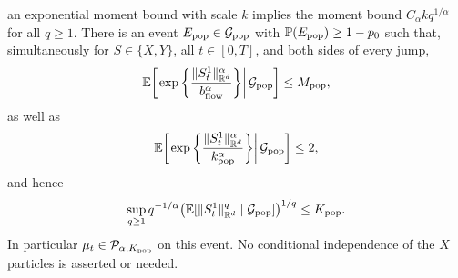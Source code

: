 \begin{lemma}
an exponential moment bound with scale $k$ implies the moment bound
$C_\alpha kq^{1/\alpha}$ for all $q\ge1$.
There is an event $E_{\rm pop}\in\mathcal G_{\rm pop}$ with
$\mathbb P(E_{\rm pop})\ge1-p_0$ such that, simultaneously for
$S\in\{X,Y\}$, all $t\in[0,T]$, and both sides of every jump,
\begin{equation}
\label{eq:population-fixed-scale-exponential}
 \mathbb E\!\left[
  \left.\exp\left\{\frac{\|S_t^1\|_{\mathbb R^d}^\alpha}{b_{\rm flow}^\alpha}\right\}
  \right|\mathcal G_{\rm pop}\right]\le M_{\rm pop},
\end{equation}
as well as
\begin{equation}
\label{eq:population-uniform-conditional-exponential}
 \mathbb E\!\left[
   \left.\exp\left\{\frac{\|S_t^1\|_{\mathbb R^d}^\alpha}
                              {k_{\rm pop}^\alpha}\right\}
   \right|\mathcal G_{\rm pop}\right]\le2,
\end{equation}
and hence
\begin{equation}
\label{eq:population-uniform-conditional-moments}
 \sup_{q\ge1}q^{-1/\alpha}
 \bigl(\mathbb E[\|S_t^1\|_{\mathbb R^d}^q\mid\mathcal G_{\rm pop}]\bigr)^{1/q}
 \le K_{\rm pop}.
\end{equation}
In particular $\mu_t\in\mathcal P_{\alpha,K_{\rm pop}}$ on this event.
No conditional independence of the $X$ particles is asserted or needed.
\end{lemma}

